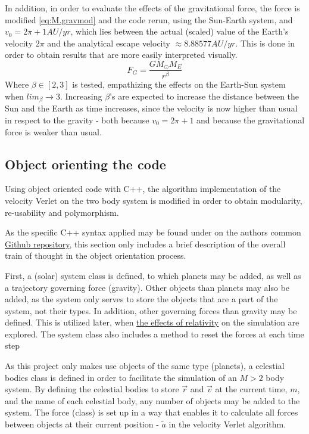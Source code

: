 \documentclass[%
oneside,                 %
final,                   %
10pt]{article}
\begin{document}
In addition, in order to evaluate the effects of the gravitational force, the force is modified \eqref{eq:M.gravmod} and the code rerun, using the Sun-Earth system, and $v_0=2\pi+1 AU/yr$, which lies between the actual (scaled) value of the Earth's velocity $2\pi$ and the analytical escape velocity $ \approx 8.88577 AU/yr$. This is done in order to obtain results that are more easily interpreted visually.
\begin{equation}
F_G=\frac{GM_{\odot}M_{E}}{r^{\beta}}
\label{eq:M.gravmod}
\end{equation}
Where $\beta \in [2,3]$ is tested, empathizing the effects on the Earth-Sun system when $lim_{\beta} \rightarrow 3$. Increasing $\beta$'s are expected to increase the distance between the Sun and the Earth as time increases, since the velocity is now higher than usual in respect to the gravity - both because $v_0=2\pi+1$ and because the gravitational force is weaker than usual.

 
\subsection{Object orienting the code}  
\label{sec:OOing}
Using object oriented code with C++, the algorithm implementation of the velocity Verlet on the two body system is modified in order to obtain modularity, re-usability and polymorphism.  \newline

As the specific C++ syntax applied may be found under on the authors common \href{https://github.com/johanere/CP3}{Github repository}, this section only includes a brief description of the overall train of thought in the object orientation process. \newline

First, a (solar) system class is defined, to which planets may be added, as well as a trajectory governing force (gravity). Other objects than planets may also be added, as the system only serves to store the objects that are a part of the system, not their types. In addition, other governing forces than gravity may be defined. This is utilized later, when \hyperref[sec:M.effectsofrel]{the effects of relativity} on the simulation are explored. The system class also includes a method to reset the forces at each time step\newline

As this project only makes use objects of the same type (planets), a celestial bodies class is defined in order to facilitate the simulation of an $M>2$ body system. By defining the celestial bodies to store $\vec{r}$ and $\vec{v}$ at the current time, $m$, and the name of each celestial body, any number of objects may be added to the system. The force (class) is set up in a way that enables it to calculate all forces between objects at their current position - $\tilde{a}$ in the velocity Verlet algorithm. \newline
\end{document}
